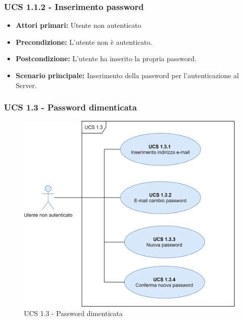\subsubsection{UCS 1.1.2 - Inserimento password}%
\begin{itemize}
\item \textbf{Attori primari:} Utente non autenticato
\item \textbf{Precondizione:} L'utente non è autenticato.
\item \textbf{Postcondizione:} L'utente ha inserito la propria password.
\item \textbf{Scenario principale:} Inserimento della password per l'autenticazione al Server.
\end{itemize}



\subsubsection{UCS 1.3 - Password dimenticata}%

\begin{figure}[h]
	\centering
	\includegraphics[scale=0.6]{Sezioni/UseCase/Immagini/UCS1.3.png}
	\caption{UCS 1.3 - Password dimenticata}
\end{figure}

